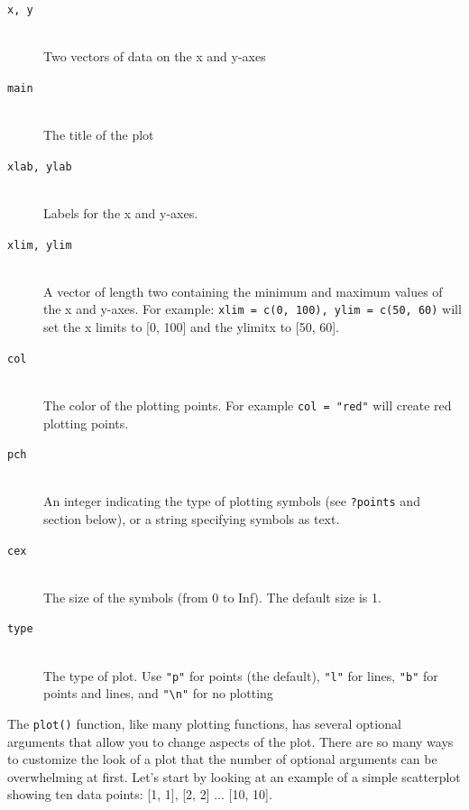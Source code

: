 \documentclass{tufte-book}\usepackage[]{graphicx}\usepackage[]{color}
\begin{document}
\begin{footnotesize}
{{\begin{description}
  \item[\tt{x, y}] \hfill \\
  Two vectors of data on the x and y-axes
    \item[\tt{main}] \hfill \\
 The title of the plot
    \item[\tt{xlab, ylab}] \hfill \\
  Labels for the x and y-axes.
    \item[\tt{xlim, ylim}] \hfill \\
 A vector of length two containing the minimum and maximum values of the x and y-axes. For example: \texttt{xlim = c(0, 100), ylim = c(50, 60)} will set the x limits to [0, 100] and the ylimitx to [50, 60].
    \item[\tt{col}] \hfill \\
    The color of the plotting points. For example \texttt{col = "red"} will create red plotting points.
\item[\tt{pch}] \hfill \\
    An integer indicating the type of plotting symbols (see \texttt{?points} and section below), or a string specifying symbols as text.
\item[\tt{cex}] \hfill \\
  The size of the symbols (from 0 to Inf). The default size is 1.
\item[\tt{type}] \hfill \\
The type of plot. Use \texttt{"p"} for points (the default), \texttt{"l"} for lines, \texttt{"b"} for points and lines, and \texttt{"\textbackslash n"} for no plotting


\end{description}

}
}
\vspace{5mm} %


The \texttt{plot()} function, like many plotting functions, has several optional arguments that allow you to change aspects of the plot. There are so many ways to customize the look of a plot that the number of optional arguments can be overwhelming at first. Let's start by looking at an example of a simple scatterplot showing ten data points: [1, 1], [2, 2] ... [10, 10].


\end{footnotesize}
\end{document}
